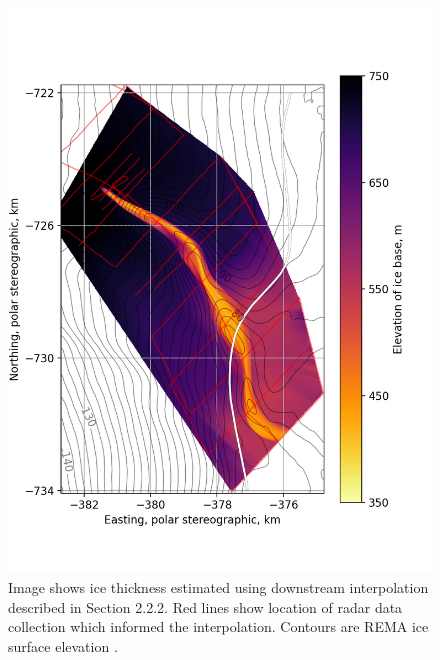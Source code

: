 \begin{figure}[!ht]
\centering
\includegraphics[width=1.1\textwidth]{chapters/2/thickness_solo.png}
\caption[Ice thickness]{Image shows ice thickness estimated using downstream interpolation described in Section 2.2.2. Red lines show location of radar data collection which informed the interpolation. Contours are REMA ice surface elevation \cite{howat2019reference}.}
\label{fig:thickness_solo}
\end{figure}



